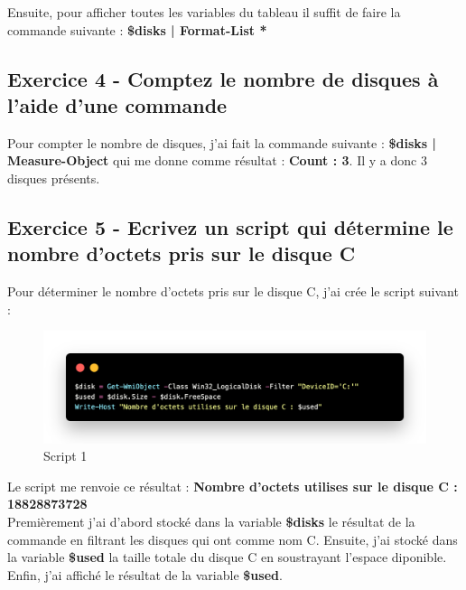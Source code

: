\documentclass[12pt, a4paper]{article}
\begin{document}
Ensuite, pour afficher toutes les variables du tableau il suffit de faire la
commande suivante : \textbf{\$disks | Format-List *}

\subsection{Exercice 4 - Comptez le nombre de disques à l’aide d’une commande}

Pour compter le nombre de disques, j'ai fait la commande suivante :
\textbf{\$disks | Measure-Object} qui me donne comme résultat :
\textbf{Count : 3}. Il y a donc 3 disques présents. 

\newpage
\subsection{Exercice 5 - Ecrivez un script qui détermine le nombre d’octets pris sur le disque C}
Pour déterminer le nombre d'octets pris sur le disque C, j'ai crée le script suivant : 

\begin{figure}[h]
    \centering
    \includegraphics[width=1\textwidth]{img/code1.png}
    \caption{Script 1}
    \label{fig:script1}
\end{figure}

Le script me renvoie ce résultat : \textbf{Nombre d'octets utilises sur le disque C : 18828873728}\\

Premièrement j'ai d'abord stocké dans la variable \textbf{\$disks} le résultat de la commande en filtrant les 
disques qui ont comme nom C. Ensuite, j'ai stocké dans la variable \textbf{\$used} la taille totale du disque C 
en soustrayant l'espace diponible.\\

Enfin, j'ai affiché le résultat de la variable \textbf{\$used}.

\newpage
\end{document}
